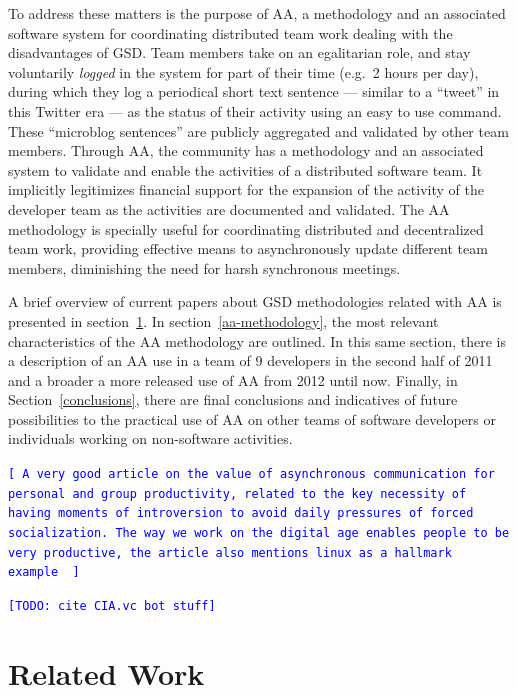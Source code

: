 \documentclass[letterpaper]{article}
\newcommand{\indraftnote}[1]{\textcolor{blue}{\texttt{\footnotesize[#1]}}}
\newcommand{\todo}[1]{\indraftnote{todo: #1}}
\begin{document}
To address these matters is the purpose of AA, a methodology and an associated software system
for coordinating distributed team work dealing with the disadvantages
of GSD. Team members take on an egalitarian role, and stay
voluntarily \textit{logged} in the system for part of their time
(e.g.\ 2 hours per day), during which they log a periodical short text
sentence --- similar to a ``tweet'' in this Twitter era --- as the
status of their activity using an easy to use command. These
``microblog sentences'' are publicly aggregated and validated by other
team members. Through AA, the community has a methodology and an associated
system to validate and enable the activities of a distributed software
team. It implicitly legitimizes financial support for the expansion of
the activity of the developer team as the activities are documented and validated.
The AA methodology is specially
useful for coordinating distributed and decentralized team work,
providing effective means to asynchronously update different team
members, diminishing the need for harsh synchronous meetings.


A brief overview of current papers about GSD methodologies related with
AA is presented in section~\ref{related-work}. In
section~\ref{aa-methodology}, the most relevant
characteristics of the AA methodology are outlined. In this same section,
there is a description of
an AA use in a team of 9 developers in the second half of
2011 and a broader a more released use of AA from 2012 until now. Finally, in Section~\ref{conclusions}, there are final
conclusions and indicatives of future possibilities to the
practical use of AA on other teams of software developers or
individuals working on non-software activities.

\indraftnote{
A very good article on the value of asynchronous communication for personal
and group productivity, related to the key necessity of having moments of
introversion to avoid daily pressures of forced socialization. The way we work
on the digital age enables people to be very productive, the article also
mentions linux as a hallmark example~\cite{Thompson:Wired:2012}
}

\indraftnote{TODO: cite CIA.vc bot stuff}

\section{Related Work}
\label{related-work}
\end{document}
